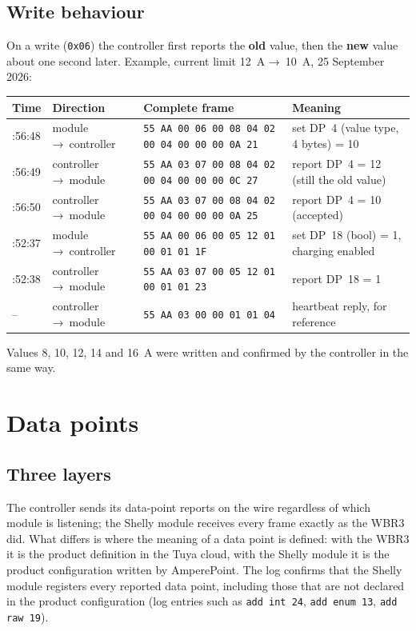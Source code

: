 \documentclass[11pt,a4paper]{article}
\newcommand{\ra}{{\symbolfont →}}
\newcommand{\hx}[1]{\texttt{#1}}
\begin{document}
\subsection{Write behaviour}

On a write (\hx{0x06}) the controller first reports the \textbf{old} value, then the \textbf{new} value about one second later. Example, current limit 12~A \ra\ 10~A, 25 September 2026:

\begin{longtable}{>{\raggedright\arraybackslash}p{1.6cm}>{\raggedright\arraybackslash}p{2.5cm}>{\raggedright\arraybackslash}p{6.3cm}>{\raggedright\arraybackslash}p{5.4cm}}
\toprule
\rowcolor{aphead}\textbf{Time} & \textbf{Direction} & \textbf{Complete frame} & \textbf{Meaning} \\
\midrule\endhead
\bottomrule\endfoot
11:56:48 & module \ra\ controller & \hx{55 AA 00 06 00 08 04 02 00 04 00 00 00 0A 21} & set DP~4 (value type, 4 bytes) = 10 \\
11:56:49 & controller \ra\ module & \hx{55 AA 03 07 00 08 04 02 00 04 00 00 00 0C 27} & report DP~4 = 12 (still the old value) \\
11:56:50 & controller \ra\ module & \hx{55 AA 03 07 00 08 04 02 00 04 00 00 00 0A 25} & report DP~4 = 10 (accepted) \\
10:52:37 & module \ra\ controller & \hx{55 AA 00 06 00 05 12 01 00 01 01 1F} & set DP~18 (bool) = 1, charging enabled \\
10:52:38 & controller \ra\ module & \hx{55 AA 03 07 00 05 12 01 00 01 01 23} & report DP~18 = 1 \\
-- & controller \ra\ module & \hx{55 AA 03 00 00 01 01 04} & heartbeat reply, for reference \\
\end{longtable}

Values 8, 10, 12, 14 and 16~A were written and confirmed by the controller in the same way.

\section{Data points}

\subsection{Three layers}

The controller sends its data-point reports on the wire regardless of which module is listening; the Shelly module receives every frame exactly as the WBR3 did. What differs is where the meaning of a data point is defined: with the WBR3 it is the product definition in the Tuya cloud, with the Shelly module it is the product configuration written by AmperePoint. The log confirms that the Shelly module registers every reported data point, including those that are not declared in the product configuration (log entries such as \texttt{add int 24}, \texttt{add enum 13}, \texttt{add raw 19}).
\end{document}

